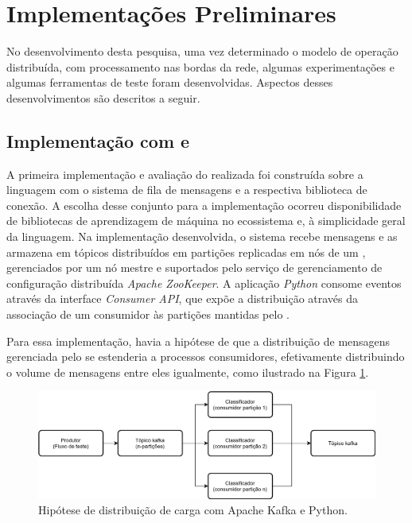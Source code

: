 
\section{Implementações Preliminares}\label{sec:resultados}

No desenvolvimento desta pesquisa, uma vez determinado o modelo de operação
distribuída, com processamento nas bordas da rede, algumas experimentações e
algumas ferramentas de teste foram desenvolvidas. Aspectos desses
desenvolvimentos são descritos a seguir.

\subsection{Implementação com \python e \kafka}

A primeira implementação e avaliação do \mfog realizada foi construída sobre a
linguagem \python com o sistema de fila de mensagens \kafka e a respectiva
biblioteca de conexão.
A escolha desse conjunto para a implementação ocorreu 
disponibilidade de bibliotecas de aprendizagem de máquina no ecossistema
\python e, à simplicidade geral da linguagem.
Na implementação desenvolvida, o sistema \kafka recebe mensagens e as armazena
em tópicos distribuídos em partições replicadas em nós de um \cluster,
gerenciados por um nó mestre e suportados pelo serviço de gerenciamento de
configuração distribuída \emph{Apache ZooKeeper}.
A aplicação \emph{Python} consome eventos através da interface \emph{Consumer API},
que expõe a distribuição através da associação de um consumidor às partições
mantidas pelo \kafka.

Para essa implementação, havia a hipótese de que a distribuição de
mensagens gerenciada pelo \kafka
se estenderia a processos consumidores, efetivamente distribuindo o volume de
mensagens entre eles igualmente, como ilustrado na Figura \ref{fig:python-kafka}.

\begin{figure}[htb]
    \centerline{
      \includegraphics[width=\linewidth,page=1]{figures/python-kafka.png}
    }
    \caption{Hipótese de distribuição de carga com Apache Kafka e Python.}
    \label{fig:python-kafka}
\end{figure}

